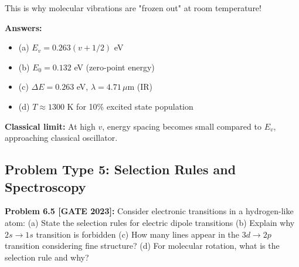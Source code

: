 \documentclass[12pt,a4paper]{article}
\begin{document}
\begin{solution}
This is why molecular vibrations are "frozen out" at room temperature!

\textbf{Answers:}
\begin{itemize}
    \item (a) $E_v = 0.263(v + 1/2)$ eV
    \item (b) $E_0 = 0.132$ eV (zero-point energy)
    \item (c) $\Delta E = 0.263$ eV, $\lambda = 4.71\,\mu$m (IR)
    \item (d) $T \approx 1300$ K for 10\% excited state population
\end{itemize}

\textbf{Classical limit:} At high $v$, energy spacing becomes small compared to $E_v$, approaching classical oscillator.
\end{solution}

\subsection{Problem Type 5: Selection Rules and Spectroscopy}

\textbf{Problem 6.5 [GATE 2023]:} Consider electronic transitions in a hydrogen-like atom:
(a) State the selection rules for electric dipole transitions
(b) Explain why $2s \to 1s$ transition is forbidden
(c) How many lines appear in the $3d \to 2p$ transition considering fine structure?
(d) For molecular rotation, what is the selection rule and why?
\end{document}
